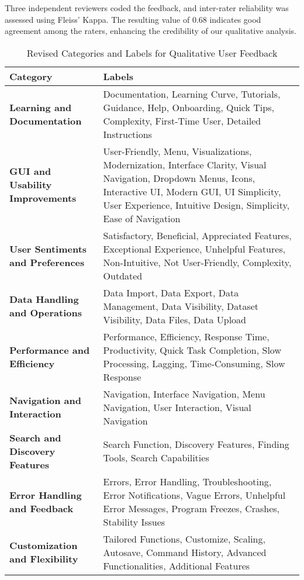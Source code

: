 \documentclass{article}
\begin{document}
Three independent reviewers coded the feedback, and inter-rater reliability was assessed using Fleiss' Kappa. The resulting value of 0.68 indicates good agreement among the raters, enhancing the credibility of our qualitative analysis.

\begin{table}[h!]
\centering
\begin{tabular}{|l|p{10cm}|}
\hline
\textbf{Category} & \textbf{Labels} \\ \hline
\textbf{Learning and Documentation} & Documentation, Learning Curve, Tutorials, Guidance, Help, Onboarding, Quick Tips, Complexity, First-Time User, Detailed Instructions \\ \hline
\textbf{GUI and Usability Improvements} & User-Friendly, Menu, Visualizations, Modernization, Interface Clarity, Visual Navigation, Dropdown Menus, Icons, Interactive UI, Modern GUI, UI Simplicity, User Experience, Intuitive Design, Simplicity, Ease of Navigation \\ \hline
\textbf{User Sentiments and Preferences} 
& Satisfactory, Beneficial, Appreciated Features, Exceptional Experience,  Unhelpful Features, Non-Intuitive, Not User-Friendly, Complexity, Outdated \\ \hline
\textbf{Data Handling and Operations} & Data Import, Data Export, Data Management, Data Visibility, Dataset Visibility, Data Files, Data Upload \\ \hline
\textbf{Performance and Efficiency} & Performance, Efficiency, Response Time, Productivity, Quick Task Completion, Slow Processing, Lagging, Time-Consuming, Slow Response \\ \hline
\textbf{Navigation and Interaction} & Navigation, Interface Navigation, Menu Navigation, User Interaction, Visual Navigation \\ \hline
\textbf{Search and Discovery Features} & Search Function, Discovery Features, Finding Tools, Search Capabilities \\ \hline
\textbf{Error Handling and Feedback} & Errors, Error Handling, Troubleshooting, Error Notifications, Vague Errors, Unhelpful Error Messages, Program Freezes, Crashes,  Stability Issues \\ \hline
\textbf{Customization and Flexibility} & Tailored Functions, Customize, Scaling, Autosave, Command History, Advanced Functionalities, Additional Features \\ \hline
\end{tabular}
\caption{Revised Categories and Labels for Qualitative User Feedback}
\label{tab:revised_categories_labels}
\end{table}
\end{document}
